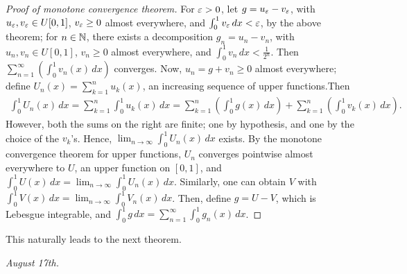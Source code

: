 \begin{proof}[Proof of monotone convergence theorem]
    For $\varepsilon > 0$, let $g = u_{\varepsilon}-v_{\varepsilon}$, with $u_{\varepsilon},v_{\varepsilon} \in U[0,1]$, $v_{\varepsilon} \geq 0$ almost everywhere, and $\int_{0}^{1} v_{\varepsilon} \, dx < \varepsilon$, by the above theorem; for $n \in \mathbb{N}$, there exists a decomposition $g_{n} = u_{n}-v_{n}$, with $u_{n},v_{n} \in U[0,1]$, $v_{n} \geq 0$ almost everywhere, and $\int_{0}^{1} v_{n} \, dx < \frac{1}{2^{n}}$. Then $\sum_{n=1}^{\infty} \left( \int_{0}^{1} v_{n}(x) \, dx \right)$ converges. Now, $u_{n} = g+v_{n} \geq 0$ almost everywhere; define $U_{n}(x) = \sum_{k=1}^{n} u_{k}(x)$, an increasing sequence of upper functions.Then
    \begin{align}
        \int_{0}^{1} U_{n}(x) \, dx = \sum_{k=1}^{n} \int_{0}^{1} u_{k}(x) \, dx = \sum_{k=1}^{n} \left( \int_{0}^{1} g(x) \, dx \right)+ \sum_{k=1}^{n} \left( \int_{0}^{1} v_{k}(x) \, dx \right).
    \end{align}
    However, both the sums on the right are finite; one by hypothesis, and one by the choice of the $v_{k}$'s. Hence, $\lim_{n \to \infty} \int_{0}^{1} U_{n}(x) \, dx$ exists. By the monotone convergence theorem for upper functions, $U_{n}$ converges pointwise almost everywhere to $U$, an upper function on $[0,1]$, and $\int_{0}^{1} U(x) \, dx = \lim_{n \to \infty} \int_{0}^{1} U_{n}(x) \, dx$. Similarly, one can obtain $V$ with $\int_{0}^{1} V(x) \, dx = \lim_{n \to \infty} \int_{0}^{1} V_{n}(x) \, dx$. Then, define $g = U-V$, which is Lebesgue integrable, and $\int_{0}^{1} g \, dx = \sum_{n=1}^{\infty}\int_{0}^{1} g_{n}(x) \, dx$.
\end{proof}

This naturally leads to the next theorem.

\noindent \textit{August 17th.}

